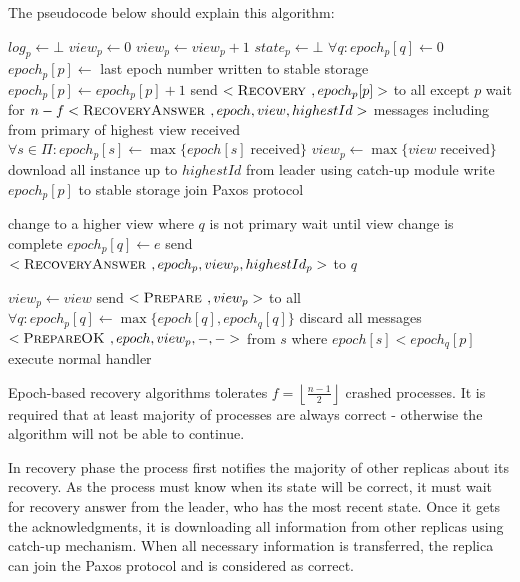 The pseudocode below should explain this algorithm:
\begin{algorithmic}[1]
  \INIT{}
    \STATE $log_p \leftarrow \bot$ %
    \STATE $view_p \leftarrow 0$
      \STATE $view_p \leftarrow view_p + 1$
    \ENDIF
    \STATE $state_p \leftarrow \bot$ %
    \STATE $\forall q : epoch_p[q] \leftarrow 0$
    \STATE
      \STATE $epoch_p[p] \leftarrow$ last epoch number written to stable storage
      \STATE $epoch_p[p] \leftarrow epoch_p[p] + 1$
      \STATE send $<\textsc{Recovery }, epoch_p[p]>$ to all except $p$
      \STATE wait for $n-f <\textsc{RecoveryAnswer }, epoch, view, highestId>$ messages including from primary of highest view received
      \STATE $\forall s \in \Pi : epoch_p[s] \leftarrow \max\{{epoch[s] \; \mathrm{ received}}\}$
      \STATE $view_p \leftarrow \max\{{ view \; \mathrm{received}}\}$
      \STATE download all instance up to $highestId$ from leader using catch-up module
    \ENDIF
      \STATE write $epoch_p[p]$ to stable storage
    \STATE
    \STATE join Paxos protocol
  \ENDINIT

  \vspace{1em}
      \STATE change to a higher view where $q$ is not primary
      \STATE wait until view change is complete
    \ENDIF
    \STATE $epoch_p[q] \leftarrow e$
    \STATE send $<\textsc{RecoveryAnswer }, epoch_p, view_p, highestId_p>$ to $q$
  \ENDUPON

  \vspace{1em}
      \STATE $view_p \leftarrow view$
      \STATE send $<\textsc{Prepare }, view_p>$ to all
    \ELSE
      \STATE $\forall q : epoch_p[q] \leftarrow \max\{{epoch[q], epoch_q[q]}\}$
        \STATE discard all messages $<\textsc{PrepareOK }, epoch, view_p, -, ->$ from $s$ where $epoch[s] < epoch_q[p]$
      \ENDFOR
      \STATE execute normal handler 
    \ENDIF
  \ENDUPON
\end{algorithmic}

Epoch-based recovery algorithms tolerates $f = \left\lfloor \frac{n-1}{2} \right\rfloor $ crashed processes. It is required that at least majority of processes are always correct - otherwise the algorithm will not be able to continue.

In recovery phase the process first notifies the majority of other replicas about its recovery. As the process must know when its state will be correct, it must wait for recovery answer from the leader, who has the most recent state. Once it gets the acknowledgments, it is downloading all information from other replicas using catch-up mechanism.  When all necessary information is transferred, the replica can join the Paxos protocol and is considered as correct.

